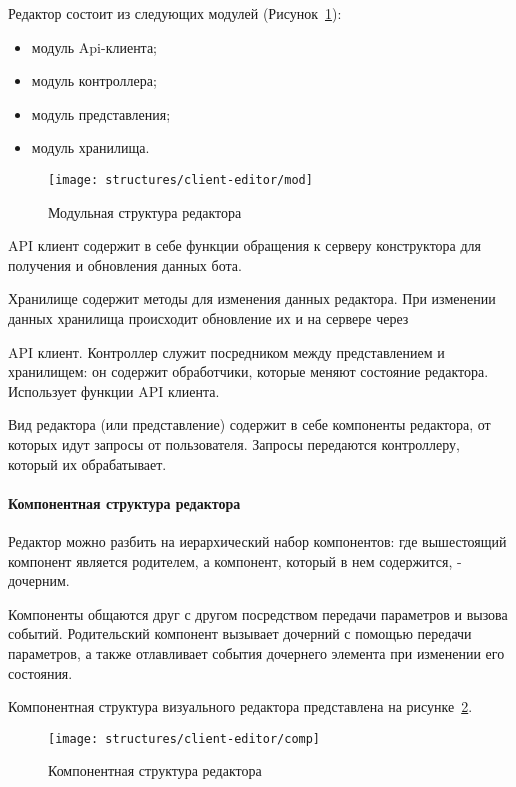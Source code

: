 Редактор состоит из следующих модулей (Рисунок~\ref{f:mod-client-editor-struct}):

\begin{itemize}
	\item модуль Api-клиента;
	\item модуль контроллера;
	\item модуль представления;
	\item модуль хранилища.
\end{itemize}

\begin{figure}[ht]
	\centering
	\vspace{0.5cm}
	\texttt{[image: structures/client-editor/mod]}
	\caption{Модульная структура редактора}
	\label{f:mod-client-editor-struct}
\end{figure}


API клиент содержит в себе функции обращения к серверу конструктора
для получения и обновления данных бота.

Хранилище содержит методы для изменения данных редактора. При
изменении данных хранилища происходит обновление их и на сервере через

API клиент.
Контроллер служит посредником между представлением и хранилищем:
он содержит обработчики, которые меняют состояние редактора. Использует
функции API клиента.

Вид редактора (или представление) содержит в себе компоненты
редактора, от которых идут запросы от пользователя. Запросы передаются
контроллеру, который их обрабатывает.


\paragraph{Компонентная структура редактора}

Редактор можно разбить на иерархический набор компонентов: где
вышестоящий компонент является родителем, а компонент, который в нем
содержится, - дочерним.

Компоненты общаются друг с другом посредством передачи параметров
и вызова событий. Родительский компонент вызывает дочерний с помощью
передачи параметров, а также отлавливает события дочернего элемента при
изменении его состояния.

Компонентная структура визуального редактора представлена на
рисунке~\ref{f:comp-client-editor-struct}.

\begin{figure}[ht]
	\centering
	\vspace{0.5cm}
	\texttt{[image: structures/client-editor/comp]}
	\caption{Компонентная структура редактора}
	\label{f:comp-client-editor-struct}
\end{figure}

